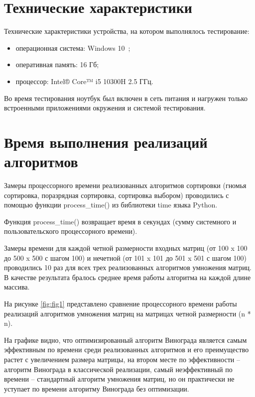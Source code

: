 \clearpage

\section{Технические характеристики}

Технические характеристики устройства, на котором выполнялось тестирование:

\begin{itemize}
	\item операционная система: Windows 10~\cite{windows10};
	\item оперативная память: 16 Гб;
	\item процессор: Intel® Core™ i5 10300H 2.5 ГГц.
\end{itemize}

Во время тестирования ноутбук был включен в сеть питания и нагружен только встроенными приложениями окружения и системой тестирования.

\section{Время выполнения реализаций алгоритмов}

Замеры процессорного времени реализованных алгоритмов сортировки (гномья сортировка, поразрядная сортировка, сортировка выбором) проводились с помощью функции process\_time() из библиотеки time языка Python. 

Функция process\_time() возвращает время в секундах (сумму системного и пользовательского процессорного времени).

Замеры времени для каждой четной размерности входных матриц (от 100 x 100 до 500 x 500 с шагом 100) и нечетной (от 101 x 101 до 501 x 501 с шагом 100) проводились 10 раз для всех трех реализованных алгоритмов умножения матриц. В качестве результата бралось среднее время работы алгоритма на каждой длине массива.


На рисунке \ref{fig:fig1} представлено сравнение процессорного времени работы реализаций алгоритмов умножения матриц на матрицах четной размерности (n * n).

На графике видно, что оптимизированный алгоритм Винограда является самым эффективным по времени среди реализованных алгоритмов и его преимущество растет с увеличением размера матрицы, на втором месте по эффективности -- алгоритм Винограда в классической реализации, самый неэффективный по времени -- стандартный алгоритм умножения матриц, но он практически не уступает по времени алгоритму Винограда без оптимизации.
\\
\\
\\
\\
\\
\\
\\
\\

